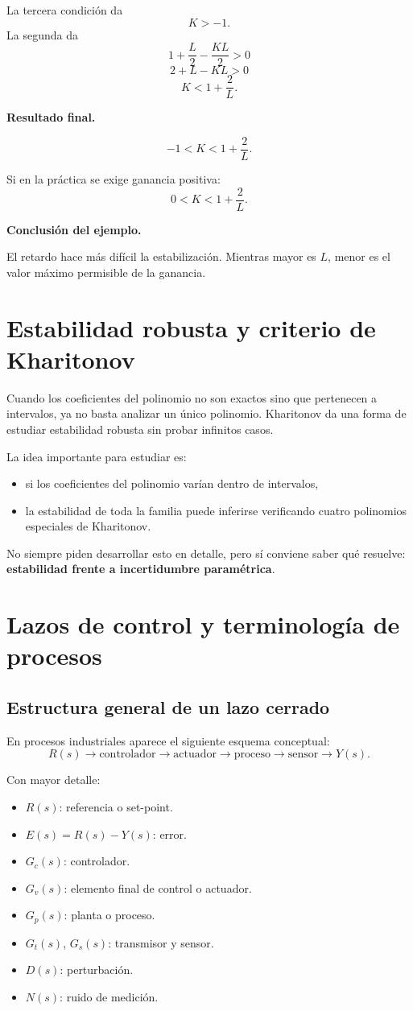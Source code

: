 \documentclass[11pt]{article}
\begin{document}
La tercera condici\'on da
\[
K>-1.
\]
La segunda da
\[
1+\frac{L}{2}-\frac{KL}{2}>0
\]
\[
2+L-KL>0
\]
\[
K<1+\frac{2}{L}.
\]

\textbf{Resultado final.}

\[
-1<K<1+\frac{2}{L}.
\]

Si en la pr\'actica se exige ganancia positiva:
\[
0<K<1+\frac{2}{L}.
\]

\textbf{Conclusi\'on del ejemplo.}

El retardo hace m\'as dif\'icil la estabilizaci\'on. Mientras mayor es $L$, menor es el valor m\'aximo permisible de la ganancia.

\section{Estabilidad robusta y criterio de Kharitonov}
Cuando los coeficientes del polinomio no son exactos sino que pertenecen a intervalos, ya no basta analizar un \'unico polinomio. Kharitonov da una forma de estudiar estabilidad robusta sin probar infinitos casos.

La idea importante para estudiar es:
\begin{itemize}
\item si los coeficientes del polinomio var\'ian dentro de intervalos,
\item la estabilidad de toda la familia puede inferirse verificando cuatro polinomios especiales de Kharitonov.
\end{itemize}

No siempre piden desarrollar esto en detalle, pero s\'i conviene saber qu\'e resuelve: \textbf{estabilidad frente a incertidumbre param\'etrica}.

\section{Lazos de control y terminolog\'ia de procesos}
\subsection{Estructura general de un lazo cerrado}
En procesos industriales aparece el siguiente esquema conceptual:
\[
R(s)\rightarrow \text{controlador} \rightarrow \text{actuador} \rightarrow \text{proceso} \rightarrow \text{sensor} \rightarrow Y(s).
\]

Con mayor detalle:
\begin{itemize}
\item $R(s)$: referencia o set-point.
\item $E(s)=R(s)-Y(s)$: error.
\item $G_c(s)$: controlador.
\item $G_v(s)$: elemento final de control o actuador.
\item $G_p(s)$: planta o proceso.
\item $G_t(s)$, $G_s(s)$: transmisor y sensor.
\item $D(s)$: perturbaci\'on.
\item $N(s)$: ruido de medici\'on.
\end{itemize}
\end{document}
